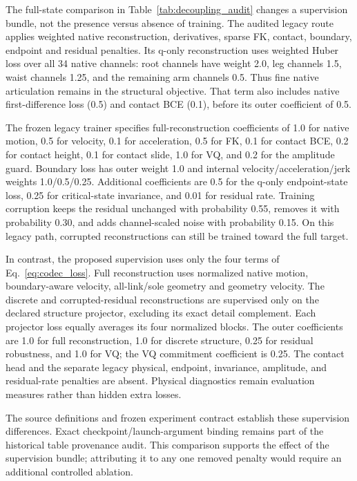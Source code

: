 The full-state comparison in Table~\ref{tab:decoupling_audit} changes a
supervision bundle, not the presence versus absence of training. The audited
legacy route applies weighted native reconstruction, derivatives, sparse FK,
contact, boundary, endpoint and residual penalties. Its q-only reconstruction
uses weighted Huber loss over all 34 native channels: root channels have weight
2.0, leg channels 1.5, waist channels 1.25, and the remaining arm channels 0.5.
Thus fine native articulation remains in the structural objective. That term
also includes native first-difference loss (0.5) and contact BCE (0.1), before
its outer coefficient of 0.5.

The frozen legacy trainer specifies full-reconstruction coefficients of 1.0
for native motion, 0.5 for velocity, 0.1 for acceleration, 0.5 for FK, 0.1 for
contact BCE, 0.2 for contact height, 0.1 for contact slide, 1.0 for VQ, and 0.2
for the amplitude guard. Boundary loss has outer weight 1.0 and internal
velocity/acceleration/jerk weights 1.0/0.5/0.25. Additional coefficients are
0.5 for the q-only endpoint-state loss, 0.25 for critical-state invariance,
and 0.01 for residual rate. Training corruption keeps the residual unchanged
with probability 0.55, removes it with probability 0.30, and adds channel-scaled
noise with probability 0.15. On this legacy path, corrupted reconstructions
can still be trained toward the full target.

In contrast, the proposed supervision uses only the four terms of
Eq.~\eqref{eq:codec_loss}. Full reconstruction uses normalized native motion,
boundary-aware velocity, all-link/sole geometry and geometry velocity.
The discrete and corrupted-residual reconstructions are supervised only on
the declared structure projector, excluding its exact detail complement.
Each projector loss equally averages its four normalized blocks. The outer
coefficients are 1.0 for full reconstruction, 1.0 for discrete structure,
0.25 for residual robustness, and 1.0 for VQ; the VQ commitment coefficient
is 0.25. The contact head and the separate legacy physical, endpoint,
invariance, amplitude, and residual-rate penalties are absent. Physical
diagnostics remain evaluation measures rather than hidden extra losses.

The source definitions and frozen experiment contract establish these
supervision differences. Exact checkpoint/launch-argument binding remains part
of the historical table provenance audit. This comparison supports the effect
of the supervision bundle; attributing it to any one removed penalty would
require an additional controlled ablation.
